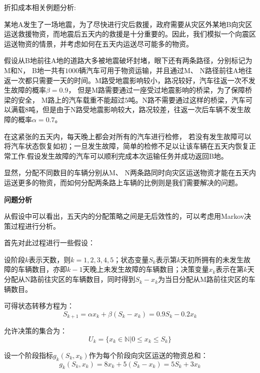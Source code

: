 \begin{example}
    折扣成本相关例题分析:

    某地A发生了一场地震，为了尽快进行灾后救援，政府需要从灾区外某地B向灾区运送救援物资，而地震后五天内的救援是十分重要的。因此，我们模拟一个向震区运送物资的情景，并考虑如何在五天内运送尽可能多的物资。

    假设从B地前往A地的道路大多被地震破坏封堵，眼下还有两条路径，分别标记为M和N， B地一共有$1000$辆汽车可用于物资运输，并且通过M、 N路径前往A地往返一次都只需要一天的时间。M路受地震影响较小，路况较好，汽车往返一次不发生故障的概率$\beta= 0.9$， 但是M路需要通过一座受过地震影响的桥梁，为了保障桥梁的安全， M路上的汽车载重不能超过$5$吨。N路不需要通过这样的桥梁，汽车可以满载$8$吨，但是由于N路受地震影响较大，路况较差，往返一次后车辆不发生故障的概率$\alpha = 0.7$。

    在这紧张的五天内，每天晚上都会对所有的汽车进行检修， 若没有发生故障可以将汽车状态恢复如初；一旦发生故障，简单的检修不足以让该车辆在五天内恢复正常工作.假设发生故障的汽车可以顺利完成本次运输任务并成功返回B地。

    显然，分配不同数目的车辆分别从M、 N两条路同时向灾区运送物资才能在五天内运送更多的物资，而如何分配两条路上车辆的比例则是我们需要解决的问题。

    \textbf{问题分析}

    从假设中可以看出，五天内的分配策略之间是无后效性的，可以考虑用Markov决策过程进行分析。

    首先对此过程进行一些假设：

    设阶段$k$表示天数，则$k = 1,2,3,4,5$；状态变量$S_k$表示第$k$天初所拥有的未发生故障的车辆数目，亦即$k-1$天晚上未发生故障的车辆数目；决策变量$x_k$表示在第$k$天分配从N路前往灾区的车辆数目，同时得到$S_k-x_k$为当日分配从M路前往灾区的车辆数目。

    可得状态转移方程为：
    \begin{equation}
        S_{k+1} = \alpha x_k+\beta(S_k-x_k) = 0.9S_k-0.2x_k
    \end{equation}

    允许决策的集合为：
    \begin{equation}
        U_k = \{x_k\in \mathbb{N} | 0\leq x_k\leq S_k\}
    \end{equation}

    设一个阶段指标$g_k(S_k, x_k)$作为每个阶段向灾区运送的物资总和：
    \begin{equation}
        g_k(S_k, x_k) = 8x_k+5(S_k-x_k) = 5S_k+3x_k
    \end{equation}


\end{example}
